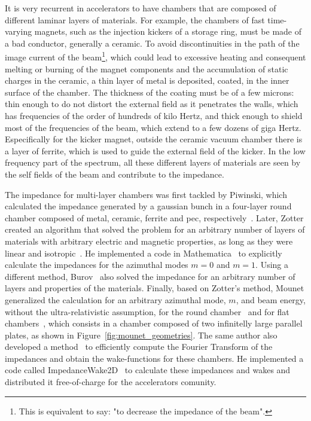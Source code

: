     It is very recurrent in accelerators to have chambers that are composed of different laminar layers of materials. For example, the chambers of fast time-varying magnets, such as the injection kickers of a storage ring, must be made of a bad conductor, generally a ceramic. To avoid discontinuities in the path of the image current of the beam\footnote{This is equivalent to say: "to decrease the impedance of the beam".}, which could lead to excessive heating and consequent melting or burning of the magnet components and the accumulation of static charges in the ceramic, a thin layer of metal is deposited, coated, in the inner surface of the chamber. The thickness of the coating must be of a few microns: thin enough to do not distort the external field as it penetrates the walls, which has frequencies of the order of hundreds of kilo Hertz, and thick enough to shield most of the frequencies of the beam, which extend to a few dozens of giga Hertz. Especifically for the kicker magnet, outside the ceramic vacuum chamber there is a layer of ferrite, which is used to guide the external field of the kicker. In the low frequency part of the spectrum, all these different layers of materials are seen by the self fields of the beam and contribute to the impedance.

    The impedance for multi-layer chambers was first tackled by Piwinski, which calculated the impedance generated by a gaussian bunch in a four-layer round chamber composed of metal, ceramic, ferrite and \gls{pec}, respectively~\cite{Piwinski}. Later, Zotter created an algorithm that solved the problem for an arbitrary number of layers of materials with arbitrary electric and magnetic properties, as long as they were linear and isotropic~\cite{Zotter1972}. He implemented a code in Mathematica~\cite{Wolfram89} to explicitly calculate the impedances for the azimuthal modes $m=0$ and $m=1$. Using a different method, Burov~\cite{Burov} also solved the impedance for an arbitrary number of layers and properties of the materials. Finally, based on Zotter's method, Mounet generalized the calculation for an arbitrary azimuthal mode, $m$, and beam energy, without the ultra-relativistic assumption, for the round chamber~\cite{Mounet2009} and for flat chambers~\cite{Mounet2010}, which consists in a chamber composed of two infinitelly large parallel plates, as shown in Figure~\ref{fig:mounet_geometries}. The same author also developed a method~\cite{MounetThesis} to efficiently compute the Fourier Transform of the impedances and obtain the wake-functions for these chambers. He implemented a code called ImpedanceWake2D~\cite{Mounet2010c} to calculate these impedances and wakes and distributed it free-of-charge for the accelerators comunity.

